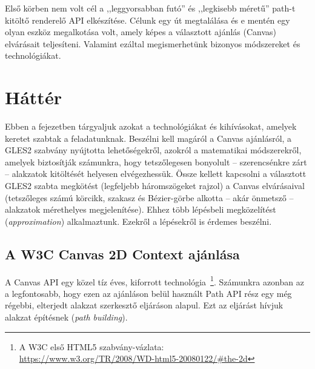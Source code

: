 \documentclass[12pt]{report}
\theoremstyle{definition}
\newcommand{\angol}[1]{\textsl{#1}}
\begin{document}
  Első körben nem volt cél a ,,leggyorsabban futó'' és ,,legkisebb
méretű'' path-t kitöltő renderelő API elkészítése. Célunk egy út
megtalálása és e mentén egy olyan eszköz megalkotása volt, amely képes
a választott ajánlás (Canvas) elvárásait teljesíteni. Valamint ezáltal
megismerhetünk bizonyos módszereket és technológiákat.



    \chapter{Háttér}
    \label{Háttér}

  Ebben a fejezetben tárgyaljuk azokat a technológiákat és kihívásokat,
amelyek keretet szabtak a feladatunknak. Beszélni kell magáról a Canvas
ajánlásról, a GLES2 szabvány nyújtotta lehetőségekről, azokról a
matematikai módszerekről, amelyek biztosítják számunkra, hogy
tetszőlegesen bonyolult -- szerencsénkre zárt -- alakzatok kitöltését
helyesen elvégezhessük. Össze kellett kapcsolni a választott GLES2
szabta megkötést (legfeljebb háromszögeket rajzol) a Canvas
elvárásaival (tetszőleges számú körcikk, szakasz és Bézier-görbe
alkotta -- akár önmetsző -- alakzatok mérethelyes megjelenítése). Ehhez
több lépésbeli megközelítést (\angol{approximation}) alkalmaztunk.
Ezekről a lépésekről is érdemes beszélni.

    \section[A Canvas ajánlás]{A W3C Canvas 2D Context ajánlása}
    \label{A Canvas ajánlás}

  A Canvas API egy közel tíz éves, kiforrott technológia~\footnote{A W3C
első HTML5 szabvány-vázlata:\\ \footnotesize{
\url{https://www.w3.org/TR/2008/WD-html5-20080122/\#the-2d}}}.
Számunkra azonban az a legfontosabb, hogy ezen az ajánláson belül
használt Path API rész egy még régebbi, elterjedt alakzat szerkesztő
eljáráson alapul. Ezt az eljárást hívjuk alakzat építésnek (\angol{path
building}).


\end{document}
